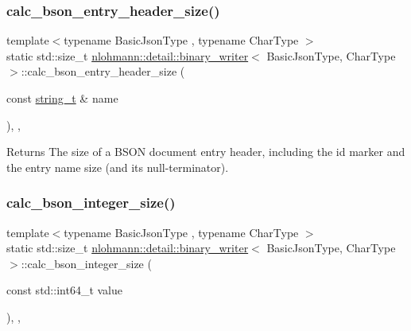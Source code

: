 \subsubsection{\texorpdfstring{calc\+\_\+bson\+\_\+entry\+\_\+header\+\_\+size()}{calc\_bson\_entry\_header\_size()}}
{\footnotesize\ttfamily template$<$typename Basic\+Json\+Type , typename Char\+Type $>$ \\
static std\+::size\+\_\+t \hyperlink{classnlohmann_1_1detail_1_1binary__writer}{nlohmann\+::detail\+::binary\+\_\+writer}$<$ Basic\+Json\+Type, Char\+Type $>$\+::calc\+\_\+bson\+\_\+entry\+\_\+header\+\_\+size (\begin{DoxyParamCaption}\item[{const \hyperlink{classnlohmann_1_1detail_1_1binary__writer_a29f2ae7a5c4a8c1dae47b3b2310de8a8}{string\+\_\+t} \&}]{name }\end{DoxyParamCaption})\hspace{0.3cm}{\ttfamily [inline]}, {\ttfamily [static]}, {\ttfamily [private]}}

\begin{DoxyReturn}{Returns}
The size of a B\+S\+ON document entry header, including the id marker and the entry name size (and its null-\/terminator). 
\end{DoxyReturn}
\mbox{\label{classnlohmann_1_1detail_1_1binary__writer_aeab70c895931b96ea598306b37eca271}} 
\subsubsection{\texorpdfstring{calc\+\_\+bson\+\_\+integer\+\_\+size()}{calc\_bson\_integer\_size()}}
{\footnotesize\ttfamily template$<$typename Basic\+Json\+Type , typename Char\+Type $>$ \\
static std\+::size\+\_\+t \hyperlink{classnlohmann_1_1detail_1_1binary__writer}{nlohmann\+::detail\+::binary\+\_\+writer}$<$ Basic\+Json\+Type, Char\+Type $>$\+::calc\+\_\+bson\+\_\+integer\+\_\+size (\begin{DoxyParamCaption}\item[{const std\+::int64\+\_\+t}]{value }\end{DoxyParamCaption})\hspace{0.3cm}{\ttfamily [inline]}, {\ttfamily [static]}, {\ttfamily [private]}}


